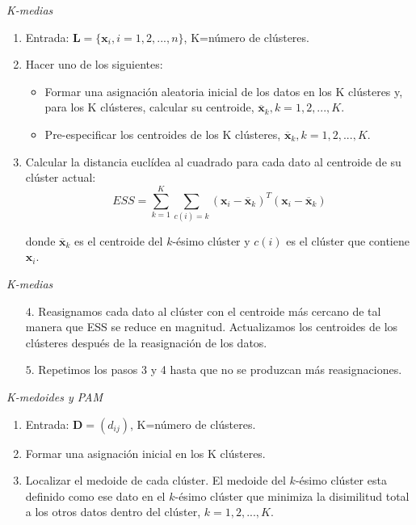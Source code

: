 \documentclass[spanish]{beamer}
\begin{document}
\begin{frame}{\textit{K-medias}}
\begin{enumerate}
\item Entrada: $\textbf{L}=\{\textbf{x}_i,i=1,2,...,n\}$, K=número de clústeres.

\item Hacer uno de los siguientes:
\begin{itemize}
\item Formar una asignación aleatoria inicial de los datos en los K clústeres y, para los K clústeres, calcular su centroide, $\overline{\textbf{x}}_k, k=1,2,...,K$.
\item Pre-especificar los centroides de los K clústeres, $\overline{\textbf{x}}_k, k=1,2,...,K$.
\end{itemize}
\item Calcular la distancia euclídea al cuadrado para cada dato al centroide de su clúster actual:
$$ESS=\sum_{k=1}^{K}\sum_{c(i)=k}(\textbf{x}_i - \overline{\textbf{x}}_k)^T(\textbf{x}_i - \overline{\textbf{x}}_k)$$

donde $\overline{\textbf{x}}_k$ es el centroide del $k$-ésimo clúster y $c(i)$ es el clúster que contiene $\textbf{x}_i$.

\end{enumerate}
\end{frame}


\begin{frame}{\textit{K-medias}}
\begin{enumerate}

\item[$4.$] Reasignamos cada dato al clúster con el centroide más cercano de tal manera que ESS se reduce en magnitud. Actualizamos los centroides de los clústeres después de la reasignación de los datos. 
\item[$5.$] Repetimos los pasos 3 y 4 hasta que no se produzcan más reasignaciones.
\end{enumerate}

\end{frame}



\begin{frame}{\textit{K-medoides y PAM}}
\begin{enumerate}
\item Entrada: $\textbf{D}=(d_{ij})$, K=número de clústeres.
\item Formar una asignación inicial en los K clústeres.
\item Localizar el medoide de cada clúster. El medoide del $k$-ésimo clúster esta definido como ese dato en el $k$-ésimo clúster que minimiza la disimilitud total a los otros datos dentro del clúster, $k=1,2,...,K$.
\end{enumerate}

\end{frame}
\end{document}
